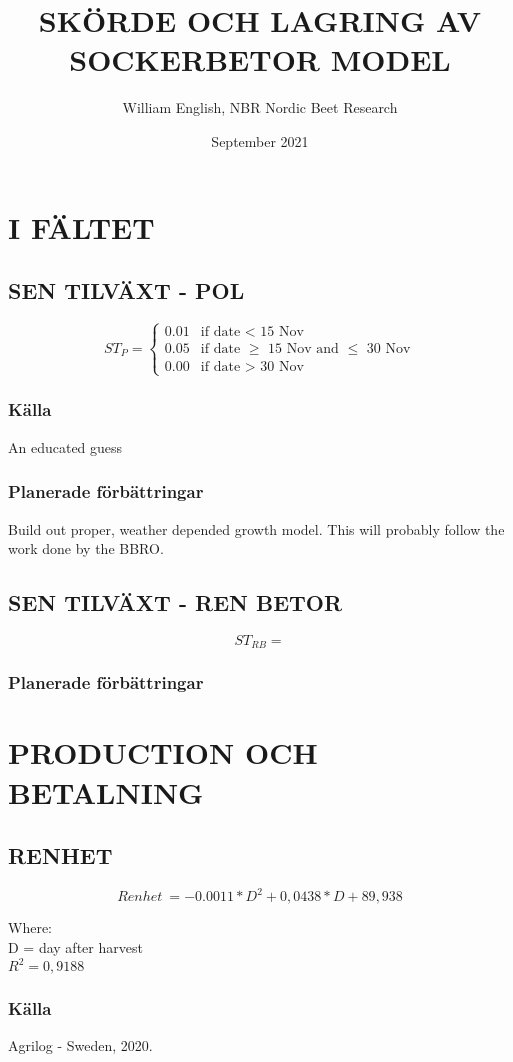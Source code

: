 \documentclass[fleqn]{article}
\title{SKÖRDE OCH LAGRING AV SOCKERBETOR MODEL}
\author{William English, NBR Nordic Beet Research}
\date{September 2021}
\begin{document}


\maketitle

\pagebreak

\section{I FÄLTET}

\subsection{SEN TILVÄXT - POL}

\begin{equation}
ST_P = 
\begin{cases}
0.01 & \text{if date < 15 Nov}\\
0.05 & \text{if date $\geq$ 15 Nov and $\leq$ 30 Nov}\\
0.00 & \text{if date > 30 Nov}
\end{cases}
\end{equation}

\subsubsection{Källa}
An educated guess

\subsubsection{Planerade förbättringar}
Build out proper, weather depended growth model. This will probably follow the work done by the BBRO.

\subsection{SEN TILVÄXT - REN BETOR}

\begin{equation}
ST_{RB} = 
\end{equation}

\subsubsection{Planerade förbättringar}

\pagebreak
\section{PRODUCTION OCH BETALNING}

\subsection{RENHET}

\[
Renhet~=-0.0011*D^2 + 0,0438*D + 89,938
\]

Where:\\
\hangindent=1.5cm
D = day after harvest\\
$R^2 = 0,9188$

\subsubsection{Källa}
Agrilog - Sweden, 2020. 
\end{document}
